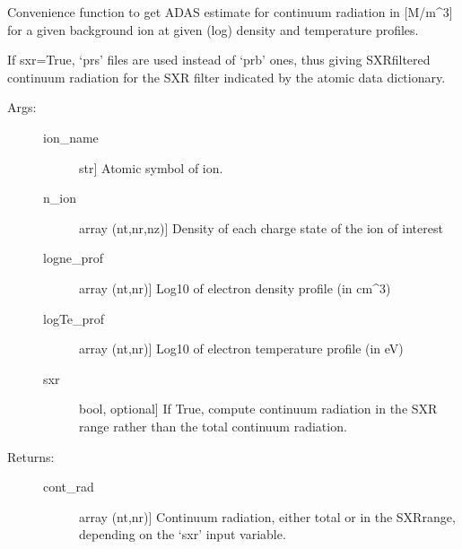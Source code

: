 \documentclass[letterpaper,10pt,english]{sphinxmanual}
\begin{document}

\begin{fulllineitems}
\label{\detokenize{aurora:aurora.atomic.get_adas_continuum_rad}}
Convenience function to get ADAS estimate for continuum radiation in {[}M/m\textasciicircum{}3{]} for a 
given background ion at given (log) density and temperature profiles.

If sxr=True, ‘prs’ files are used instead of ‘prb’ ones, thus giving SXR\sphinxhyphen{}filtered
continuum radiation for the SXR filter indicated by the atomic data dictionary.
\begin{description}
\item[{Args:}] \leavevmode\begin{description}
\item[{ion\_name}] \leavevmode{[}str{]}
Atomic symbol of ion.

\item[{n\_ion}] \leavevmode{[}array (nt,nr,nz){]}
Density of each charge state of the ion of interest

\item[{logne\_prof}] \leavevmode{[}array (nt,nr){]}
Log\sphinxhyphen{}10 of electron density profile (in cm\textasciicircum{}\sphinxhyphen{}3)

\item[{logTe\_prof}] \leavevmode{[}array (nt,nr){]}
Log\sphinxhyphen{}10 of electron temperature profile (in eV)

\item[{sxr}] \leavevmode{[}bool, optional{]}
If True, compute continuum radiation in the SXR range rather than the total 
continuum radiation.

\end{description}

\item[{Returns:}] \leavevmode\begin{description}
\item[{cont\_rad}] \leavevmode{[}array (nt,nr){]}
Continuum radiation, either total or in the SXR\sphinxhyphen{}range, depending on the 
‘sxr’ input variable.

\end{description}

\end{description}

\end{fulllineitems}
\end{document}

